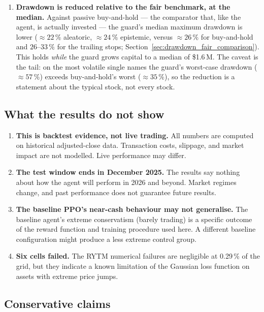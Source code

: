 \begin{enumerate}
  \item \textbf{Drawdown is reduced relative to the fair benchmark, at the median.} Against passive buy-and-hold --- the comparator that, like the agent, is actually invested --- the guard's median maximum drawdown is lower ($\approx 22\,\%$ aleatoric, $\approx 24\,\%$ epistemic, versus $\approx 26\,\%$ for buy-and-hold and $26$--$33\,\%$ for the trailing stops; Section~\ref{sec:drawdown_fair_comparison}). This holds \emph{while} the guard grows capital to a median of \$1.6\,M. The caveat is the tail: on the most volatile single names the guard's worst-case drawdown ($\approx 57\,\%$) exceeds buy-and-hold's worst ($\approx 35\,\%$), so the reduction is a statement about the typical stock, not every stock.
\end{enumerate}

\subsection{What the results do not show}

\begin{enumerate}
  \item \textbf{This is backtest evidence, not live trading.} All numbers are computed on historical adjusted-close data. Transaction costs, slippage, and market impact are not modelled. Live performance may differ.

  \item \textbf{The test window ends in December 2025.} The results say nothing about how the agent will perform in 2026 and beyond. Market regimes change, and past performance does not guarantee future results.

  \item \textbf{The baseline PPO's near-cash behaviour may not generalise.} The baseline agent's extreme conservatism (barely trading) is a specific outcome of the reward function and training procedure used here. A different baseline configuration might produce a less extreme control group.

  \item \textbf{Six cells failed.} The RYTM numerical failures are negligible at 0.29\,\% of the grid, but they indicate a known limitation of the Gaussian loss function on assets with extreme price jumps.
\end{enumerate}

\subsection{Conservative claims}

